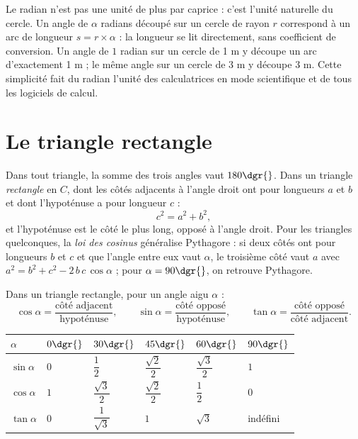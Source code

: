 \begin{remarque}
Le radian n'est pas une unité de plus par caprice : c'est l'unité naturelle du cercle. Un angle de $\alpha$ radians découpé sur un cercle de rayon $r$ correspond à un arc de longueur $s = r \times \alpha$ : la longueur se lit directement, sans coefficient de conversion. Un angle de $1$ radian sur un cercle de 1 m y découpe un arc d'exactement 1 m ; le même angle sur un cercle de 3 m y découpe 3 m. Cette simplicité fait du radian l'unité des calculatrices en mode scientifique et de tous les logiciels de calcul.
\end{remarque}

\section{Le triangle rectangle}

\begin{propriete}
Dans tout triangle, la somme des trois angles vaut $180\dgr{}$. Dans un triangle \emph{rectangle} en $C$, dont les côtés adjacents à l'angle droit ont pour longueurs $a$ et $b$ et dont l'hypoténuse a pour longueur $c$ :
\[
c^{2} = a^{2} + b^{2},
\]
et l'hypoténuse est le côté le plus long, opposé à l'angle droit. Pour les triangles quelconques, la \emph{loi des cosinus} généralise Pythagore : si deux côtés ont pour longueurs $b$ et $c$ et que l'angle entre eux vaut $\alpha$, le troisième côté vaut $a$ avec $a^{2} = b^{2} + c^{2} - 2\,b\,c\,\cos \alpha$ ; pour $\alpha = 90\dgr{}$, on retrouve Pythagore.
\end{propriete}

\begin{propriete}
Dans un triangle rectangle, pour un angle aigu $\alpha$ :
\[
\cos \alpha = \frac{\text{côté adjacent}}{\text{hypoténuse}}, \qquad
\sin \alpha = \frac{\text{côté opposé}}{\text{hypoténuse}}, \qquad
\tan \alpha = \frac{\text{côté opposé}}{\text{côté adjacent}} .
\]
\end{propriete}

\begin{center}
\small
\begin{tabular}{C{1.7cm}C{1.9cm}C{1.9cm}C{1.9cm}C{1.9cm}C{1.7cm}}
\toprule
{}$\alpha$ & $0\dgr{}$ & $30\dgr{}$ & $45\dgr{}$ & $60\dgr{}$ & $90\dgr{}$\\
\midrule
$\sin \alpha$ & $0$ & $\dfrac{1}{2}$ & $\dfrac{\sqrt{2}}{2}$ & $\dfrac{\sqrt{3}}{2}$ & $1$\\
$\cos \alpha$ & $1$ & $\dfrac{\sqrt{3}}{2}$ & $\dfrac{\sqrt{2}}{2}$ & $\dfrac{1}{2}$ & $0$\\
$\tan \alpha$ & $0$ & $\dfrac{1}{\sqrt{3}}$ & $1$ & $\sqrt{3}$ & indéfini\\
\bottomrule
\end{tabular}
\label{ch5:tab:trigo}
\end{center}

